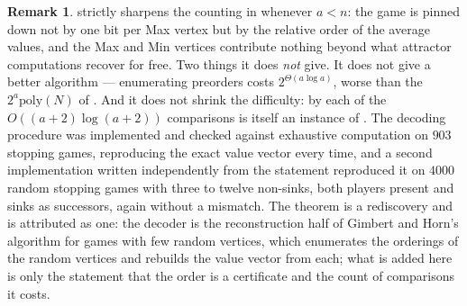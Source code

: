 \documentclass[11pt]{article}
\theoremstyle{plain}
\theoremstyle{definition}
\newtheorem{remark}[theorem]{Remark}
\begin{document}
\begin{remark}
 strictly sharpens the counting in
 whenever $a<n$: the game is pinned down not
by one bit per Max vertex but by the relative order of the average values,
and the Max and Min vertices contribute nothing beyond what attractor
computations recover for free. Two things it does \emph{not} give. It does
not give a better algorithm --- enumerating preorders costs
$2^{\Theta(a\log a)}$, worse than the $2^{a}\mathrm{poly}(N)$ of
. And it does not shrink the difficulty: by
 each of the $O((a+2)\log(a+2))$ comparisons
is itself an instance of . The decoding procedure was
implemented and checked against exhaustive computation on $903$ stopping
games, reproducing the exact value vector every time, and a second
implementation written independently from the statement reproduced it on
$4000$ random stopping games with three to twelve non-sinks, both players
present and sinks as successors, again without a mismatch. The theorem is a
rediscovery and is attributed as one: the decoder is the reconstruction
half of Gimbert and Horn's algorithm for games with few random vertices,
which enumerates the orderings of the random vertices and rebuilds the
value vector from each; what is added here is only the statement that the
order is a certificate and the count of comparisons it costs.
\end{remark}
\end{document}
